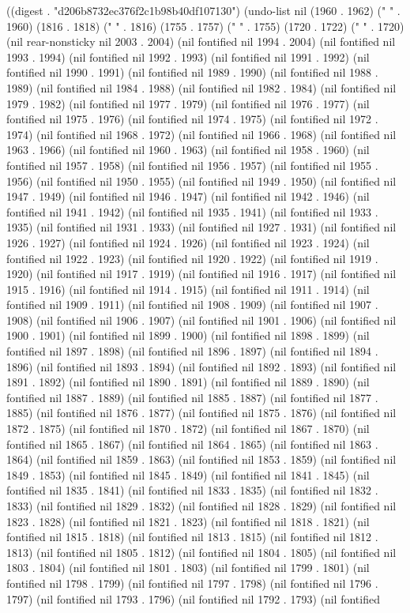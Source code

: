 
((digest . "d206b8732ec376f2c1b98b40df107130") (undo-list nil (1960 . 1962) ("   " . 1960) (1816 . 1818) ("   " . 1816) (1755 . 1757) ("   " . 1755) (1720 . 1722) ("   " . 1720) (nil rear-nonsticky nil 2003 . 2004) (nil fontified nil 1994 . 2004) (nil fontified nil 1993 . 1994) (nil fontified nil 1992 . 1993) (nil fontified nil 1991 . 1992) (nil fontified nil 1990 . 1991) (nil fontified nil 1989 . 1990) (nil fontified nil 1988 . 1989) (nil fontified nil 1984 . 1988) (nil fontified nil 1982 . 1984) (nil fontified nil 1979 . 1982) (nil fontified nil 1977 . 1979) (nil fontified nil 1976 . 1977) (nil fontified nil 1975 . 1976) (nil fontified nil 1974 . 1975) (nil fontified nil 1972 . 1974) (nil fontified nil 1968 . 1972) (nil fontified nil 1966 . 1968) (nil fontified nil 1963 . 1966) (nil fontified nil 1960 . 1963) (nil fontified nil 1958 . 1960) (nil fontified nil 1957 . 1958) (nil fontified nil 1956 . 1957) (nil fontified nil 1955 . 1956) (nil fontified nil 1950 . 1955) (nil fontified nil 1949 . 1950) (nil fontified nil 1947 . 1949) (nil fontified nil 1946 . 1947) (nil fontified nil 1942 . 1946) (nil fontified nil 1941 . 1942) (nil fontified nil 1935 . 1941) (nil fontified nil 1933 . 1935) (nil fontified nil 1931 . 1933) (nil fontified nil 1927 . 1931) (nil fontified nil 1926 . 1927) (nil fontified nil 1924 . 1926) (nil fontified nil 1923 . 1924) (nil fontified nil 1922 . 1923) (nil fontified nil 1920 . 1922) (nil fontified nil 1919 . 1920) (nil fontified nil 1917 . 1919) (nil fontified nil 1916 . 1917) (nil fontified nil 1915 . 1916) (nil fontified nil 1914 . 1915) (nil fontified nil 1911 . 1914) (nil fontified nil 1909 . 1911) (nil fontified nil 1908 . 1909) (nil fontified nil 1907 . 1908) (nil fontified nil 1906 . 1907) (nil fontified nil 1901 . 1906) (nil fontified nil 1900 . 1901) (nil fontified nil 1899 . 1900) (nil fontified nil 1898 . 1899) (nil fontified nil 1897 . 1898) (nil fontified nil 1896 . 1897) (nil fontified nil 1894 . 1896) (nil fontified nil 1893 . 1894) (nil fontified nil 1892 . 1893) (nil fontified nil 1891 . 1892) (nil fontified nil 1890 . 1891) (nil fontified nil 1889 . 1890) (nil fontified nil 1887 . 1889) (nil fontified nil 1885 . 1887) (nil fontified nil 1877 . 1885) (nil fontified nil 1876 . 1877) (nil fontified nil 1875 . 1876) (nil fontified nil 1872 . 1875) (nil fontified nil 1870 . 1872) (nil fontified nil 1867 . 1870) (nil fontified nil 1865 . 1867) (nil fontified nil 1864 . 1865) (nil fontified nil 1863 . 1864) (nil fontified nil 1859 . 1863) (nil fontified nil 1853 . 1859) (nil fontified nil 1849 . 1853) (nil fontified nil 1845 . 1849) (nil fontified nil 1841 . 1845) (nil fontified nil 1835 . 1841) (nil fontified nil 1833 . 1835) (nil fontified nil 1832 . 1833) (nil fontified nil 1829 . 1832) (nil fontified nil 1828 . 1829) (nil fontified nil 1823 . 1828) (nil fontified nil 1821 . 1823) (nil fontified nil 1818 . 1821) (nil fontified nil 1815 . 1818) (nil fontified nil 1813 . 1815) (nil fontified nil 1812 . 1813) (nil fontified nil 1805 . 1812) (nil fontified nil 1804 . 1805) (nil fontified nil 1803 . 1804) (nil fontified nil 1801 . 1803) (nil fontified nil 1799 . 1801) (nil fontified nil 1798 . 1799) (nil fontified nil 1797 . 1798) (nil fontified nil 1796 . 1797) (nil fontified nil 1793 . 1796) (nil fontified nil 1792 . 1793) (nil fontified 